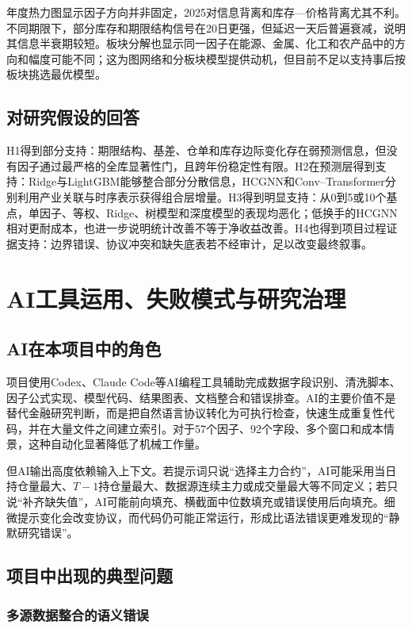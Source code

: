 \documentclass[UTF8,zihao=-4,fontset=ubuntu]{ctexart}
\begin{document}
年度热力图显示因子方向并非固定，2025对信息背离和库存—价格背离尤其不利。不同期限下，部分库存和期限结构信号在20日更强，但延迟一天后普遍衰减，说明其信息半衰期较短。板块分解也显示同一因子在能源、金属、化工和农产品中的方向和幅度可能不同；这为图网络和分板块模型提供动机，但目前不足以支持事后按板块挑选最优模型。

\subsection{对研究假设的回答}

H1得到部分支持：期限结构、基差、仓单和库存边际变化存在弱预测信息，但没有因子通过最严格的全库显著性门，且跨年份稳定性有限。H2在预测层得到支持：Ridge与LightGBM能够整合部分分散信息，HCGNN和Conv--Transformer分别利用产业关联与时序表示获得组合层增量。H3得到明显支持：从0到5或10个基点，单因子、等权、Ridge、树模型和深度模型的表现均恶化；低换手的HCGNN相对更耐成本，也进一步说明统计改善不等于净收益改善。H4也得到项目过程证据支持：边界错误、协议冲突和缺失底表若不经审计，足以改变最终叙事。

\section{AI工具运用、失败模式与研究治理}

\subsection{AI在本项目中的角色}

项目使用Codex、Claude Code等AI编程工具辅助完成数据字段识别、清洗脚本、因子公式实现、模型代码、结果图表、文档整合和错误排查。AI的主要价值不是替代金融研究判断，而是把自然语言协议转化为可执行检查，快速生成重复性代码，并在大量文件之间建立索引。对于57个因子、92个字段、多个窗口和成本情景，这种自动化显著降低了机械工作量。

但AI输出高度依赖输入上下文。若提示词只说“选择主力合约”，AI可能采用当日持仓量最大、\(T-1\)持仓量最大、数据源连续主力或成交量最大等不同定义；若只说“补齐缺失值”，AI可能前向填充、横截面中位数填充或错误使用后向填充。细微提示变化会改变协议，而代码仍可能正常运行，形成比语法错误更难发现的“静默研究错误”。

\subsection{项目中出现的典型问题}

\subsubsection{多源数据整合的语义错误}
\end{document}
